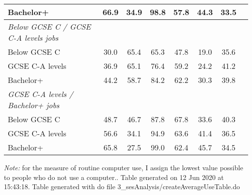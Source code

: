 \begin{center}
\begin{threeparttable}[!h]
\begin{tabular}{lccccccc}
\hspace{3mm}Bachelor+&        66.9&        34.9&        98.8&        57.8&        44.3&        33.5\\
\midrule \textit{Below GCSE C / GCSE C-A levels jobs}\\  \midrule 
\hspace{3mm}Below GCSE C&        30.0&        65.4&        65.3&        47.8&        19.0&        35.6\\
\hspace{3mm}GCSE C-A levels&        36.9&        65.1&        76.4&        59.2&        24.2&        41.2\\
\hspace{3mm}Bachelor+&        44.2&        58.7&        84.2&        62.2&        30.3&        39.8\\
\midrule \textit{GCSE C-A levels / Bachelor+ jobs}\\  \midrule
\hspace{3mm}Below GCSE C&        48.7&        46.7&        87.8&        67.8&        33.6&        40.3\\
\hspace{3mm}GCSE C-A levels&        56.6&        34.1&        94.9&        63.6&        41.4&        36.5\\
\hspace{3mm}Bachelor+&        65.8&        27.5&        99.0&        62.4&        45.7&        34.5\\
\bottomrule
\bottomrule
\end{tabular}
\begin{tablenotes}
\item \footnotesize \textit{Note:} for the measure of routine computer use, I assign the lowest value possible to people who do not use a computer.. Table generated on 12 Jun 2020 at 15:43:18. Table generated with do file 3\_sesAnalysis/createAverageUseTable.do
\end{tablenotes}
\end{threeparttable}
\end{center}
